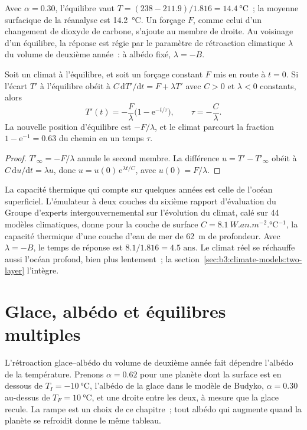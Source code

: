 Avec $\alpha = 0.30$, l'équilibre vaut $T = (238 - 211.9)/1.816 =
\qty{14.4}{\celsius}$~; la moyenne surfacique de la réanalyse est
\qty{14.2}{\celsius}. Un forçage $F$, comme celui d'un changement de
dioxyde de carbone, s'ajoute au membre de droite. Au voisinage d'un équilibre, la réponse est
régie par le paramètre de rétroaction climatique $\lambda$ du volume de deuxième année~:
à albédo fixé, $\lambda = -B$.

\begin{theorem}\label{thm:b3:climate-models:response}
Soit un climat à l'équilibre, et soit un forçage constant $F$ mis en route
à $t = 0$. Si l'écart $T'$ à l'équilibre obéit à $C\,\mathrm
dT'/\mathrm dt = F + \lambda T'$ avec $C > 0$ et $\lambda < 0$ constants,
alors
\[
T'(t) = -\frac{F}{\lambda}\Big(1 - \mathrm e^{-t/\tau}\Big), \qquad
\tau = -\frac{C}{\lambda} .
\]
La nouvelle position d'équilibre est $-F/\lambda$, et le climat parcourt la fraction $1
- \mathrm e^{-1} = \num{0.63}$ du chemin en un temps $\tau$.
\end{theorem}

\begin{proof}
$T'_\infty = -F/\lambda$ annule le second membre. La différence
$u = T' - T'_\infty$ obéit à $C\,\mathrm du/\mathrm dt = \lambda u$, donc $u =
u(0)\,\mathrm e^{\lambda t/C}$, avec $u(0) = F/\lambda$.
\end{proof}

La capacité thermique qui compte sur quelques années est celle de l'océan superficiel.
L'émulateur à deux couches du sixième rapport d'évaluation du
Groupe d'experts intergouvernemental sur l'évolution du climat, calé sur 44 modèles
climatiques, donne pour la couche de surface $C = \qty{8.1}{W.an.m^{-2}.\celsius^{-1}}$, la
capacité thermique d'une couche d'eau de mer de \qty{62}{m} de profondeur. Avec $\lambda = -B$, le
temps de réponse est $8.1/1.816 = \num{4.5}\text{ ans}$. Le climat réel se réchauffe aussi
l'océan profond, bien plus lentement~; la section~\ref{sec:b3:climate-models:two-layer}
l'intègre.

\section{Glace, albédo et équilibres multiples}\label{sec:b3:climate-models:multiple}

L'rétroaction glace--albédo du volume de deuxième année fait dépendre l'albédo de la
température. Prenons $\alpha = 0.62$ pour une planète dont la surface est en dessous de
$T_I = \qty{-10}{\celsius}$, l'albédo de la glace dans le modèle de Budyko, $\alpha
= 0.30$ au-dessus de $T_F = \qty{+10}{\celsius}$, et une droite entre les deux, à mesure que
la glace recule. La rampe est un choix de ce chapitre~; tout albédo qui augmente quand la
planète se refroidit donne le même tableau.

